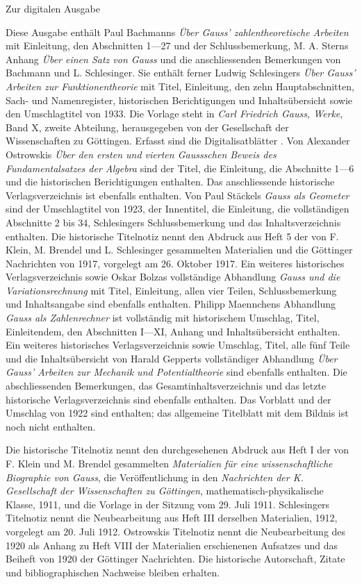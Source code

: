 \clearpage\NoSourceHead
\begin{center}\large Zur digitalen Ausgabe\end{center}
Diese Ausgabe enthält Paul Bachmanns \textit{Über Gauss’ zahlentheoretische Arbeiten} mit Einleitung, den Abschnitten 1—27 und der Schlussbemerkung, M. A. Sterns Anhang \textit{Über einen Satz von Gauss} und die anschliessenden Bemerkungen von Bachmann und L. Schlesinger. Sie enthält ferner Ludwig Schlesingers \textit{Über Gauss’ Arbeiten zur Funktionentheorie} mit Titel, Einleitung, den zehn Hauptabschnitten, Sach- und Namenregister, historischen Berichtigungen und Inhaltsübersicht sowie den Umschlagtitel von 1933. Die Vorlage steht in \textit{Carl Friedrich Gauss, Werke}, Band X, zweite Abteilung, herausgegeben von der Gesellschaft der Wissenschaften zu Göttingen. Erfasst sind die Digitalisatblätter \SourceScope. Von Alexander Ostrowskis \textit{Über den ersten und vierten Gaussschen Beweis des Fundamentalsatzes der Algebra} sind der Titel, die Einleitung, die Abschnitte 1—6 und die historischen Berichtigungen enthalten. Das anschliessende historische Verlagsverzeichnis ist ebenfalls enthalten. Von Paul Stäckels \textit{Gauss als Geometer} sind der Umschlagtitel von 1923, der Innentitel, die Einleitung, die vollständigen Abschnitte 2 bis 34, Schlesingers Schlussbemerkung und das Inhaltsverzeichnis enthalten. Die historische Titelnotiz nennt den Abdruck aus Heft 5 der von F. Klein, M. Brendel und L. Schlesinger gesammelten Materialien und die Göttinger Nachrichten von 1917, vorgelegt am 26. Oktober 1917. Ein weiteres historisches Verlagsverzeichnis sowie Oskar Bolzas vollständige Abhandlung \textit{Gauss und die Variationsrechnung} mit Titel, Einleitung, allen vier Teilen, Schlussbemerkung und Inhaltsangabe sind ebenfalls enthalten. Philipp Maennchens Abhandlung \textit{Gauss als Zahlenrechner} ist vollständig mit historischem Umschlag, Titel, Einleitendem, den Abschnitten I—XI, Anhang und Inhaltsübersicht enthalten. Ein weiteres historisches Verlagsverzeichnis sowie Umschlag, Titel, alle fünf Teile und die Inhaltsübersicht von Harald Gepperts vollständiger Abhandlung \textit{Über Gauss’ Arbeiten zur Mechanik und Potentialtheorie} sind ebenfalls enthalten. Die abschliessenden Bemerkungen, das Gesamtinhaltsverzeichnis und das letzte historische Verlagsverzeichnis sind ebenfalls enthalten. Das Vorblatt und der Umschlag von 1922 sind enthalten; das allgemeine Titelblatt mit dem Bildnis ist noch nicht enthalten.

Die historische Titelnotiz nennt den durchgesehenen Abdruck aus Heft I der von F. Klein und M. Brendel gesammelten \textit{Materialien für eine wissenschaftliche Biographie von Gauss}, die Veröffentlichung in den \textit{Nachrichten der K. Gesellschaft der Wissenschaften zu Göttingen}, mathematisch-physikalische Klasse, 1911, und die Vorlage in der Sitzung vom 29. Juli 1911. Schlesingers Titelnotiz nennt die Neubearbeitung aus Heft III derselben Materialien, 1912, vorgelegt am 20. Juli 1912. Ostrowskis Titelnotiz nennt die Neubearbeitung des 1920 als Anhang zu Heft VIII der Materialien erschienenen Aufsatzes und das Beiheft von 1920 der Göttinger Nachrichten. Die historische Autorschaft, Zitate und bibliographischen Nachweise bleiben erhalten.

